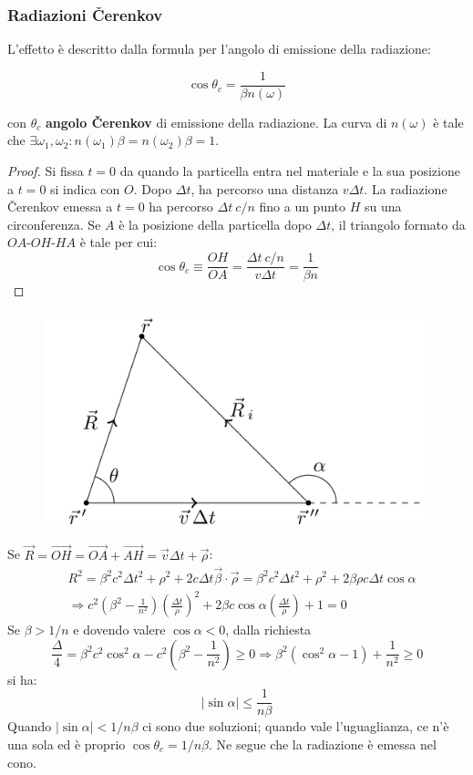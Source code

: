 \documentclass[10pt, a4paper]{scrartcl}
\numberwithin{equation}{subsection}
\theoremstyle{style1}
\newenvironment{boxenv}[1][]{
    \begin{eqbox}[#1]
    }{
   \end{eqbox}
}
\begin{document}
\subsubsection{Radiazioni \v Cerenkov}

L'effetto \`e descritto dalla formula per l'angolo di emissione della radiazione:
\begin{boxenv}[]
\begin{equation}
	\cos \theta _c = \frac{1}{ \beta  n(\omega)}
\end{equation}
\end{boxenv}
\noindent con $\theta _c$ \textbf{angolo \v Cerenkov} di emissione della radiazione. La curva di $n(\omega)$ \`e tale che $\exists \omega_1, \omega_2 : n(\omega_1) \beta = n(\omega_2)\beta  = 1$.
\begin{proof}
	Si fissa $t=0$ da quando la particella entra nel materiale e la sua posizione a $t=0$ si indica con $O$. Dopo $\Delta t$, ha percorso una distanza $v\Delta t $. La radiazione \v Cerenkov emessa a $t=0$ ha percorso $\Delta t\ c / n$ fino a un punto $H$ su una circonferenza. Se $A$ \`e la posizione della particella dopo $\Delta  t$, il triangolo formato da $OA$-$OH$-$HA$ \`e tale per cui:
	\[
	\cos \theta  _c \equiv \frac{OH}{OA} = \frac{\Delta t\ c / n}{v \Delta  t} = \frac{1}{\beta  n}
	\] 
\end{proof}
\begin{figure}[h!]
	\centering
	\includegraphics[width=.4\columnwidth]{c2.png}
\end{figure}
\noindent Se $\vec{R} = \vec{OH} = \vec{OA}+\vec{AH}= \vec{v}\Delta  t + \vec{\rho }$:
\[
	\begin{split}
		&R^2 = \beta ^2 c^2 \Delta  t ^2 + \rho ^2 + 2c\Delta  t \vec{\beta }\cdot \vec{\rho }  = \beta ^2 c^2 \Delta t^2 + \rho ^2 + 2 \beta  \rho  c \Delta  t \cos \alpha \\
		&\Rightarrow c^2 \left(\beta ^2 - \frac{1}{n^2}\right) \left(\frac{\Delta  t}{\rho }\right) ^2 + 2 \beta  c \cos \alpha  \left(\frac{\Delta  t}{\rho }\right) +1 = 0
	\end{split}
\] 
Se $\beta  > 1 / n$ e dovendo valere $\cos \alpha  < 0$, dalla richiesta
\[
\frac{\Delta }{4} = \beta ^2 c^2 \cos^2 \alpha  - c^2 \left(\beta ^2 - \frac{1}{n^2}\right) \ge 0\Rightarrow \beta ^2 (\cos^2 \alpha  -1) + \frac{1}{n^2}\ge 0
\] 
si ha:
\begin{equation}
	\left\lvert \sin \alpha  \right\rvert \le \frac{1}{n \beta }
\end{equation}
Quando $\left\lvert \sin \alpha  \right\rvert < 1 / n\beta $ ci sono due soluzioni; quando vale l'uguaglianza, ce n'\`e una sola ed \`e proprio $\cos \theta _c = 1 / n\beta $. Ne segue che la radiazione \`e emessa nel cono.
\end{document}
